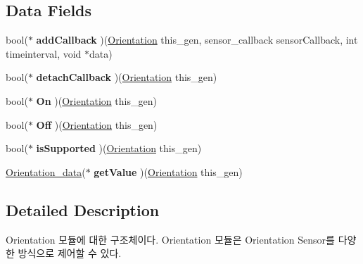 \subsection*{Data Fields}
\begin{DoxyCompactItemize}
\item 
\hypertarget{struct__Orientation_a62e2301d56463501b712969250de0b51}{bool($\ast$ {\bfseries add\-Callback} )(\hyperlink{struct__Orientation}{Orientation} this\-\_\-gen, sensor\-\_\-callback sensor\-Callback, int timeinterval, void $\ast$data)}\label{struct__Orientation_a62e2301d56463501b712969250de0b51}

\item 
\hypertarget{struct__Orientation_a5a0f426bae69f9f93d2455d65089084d}{bool($\ast$ {\bfseries detach\-Callback} )(\hyperlink{struct__Orientation}{Orientation} this\-\_\-gen)}\label{struct__Orientation_a5a0f426bae69f9f93d2455d65089084d}

\item 
\hypertarget{struct__Orientation_a1fdc91ded986983fc430dbb768964cf1}{bool($\ast$ {\bfseries On} )(\hyperlink{struct__Orientation}{Orientation} this\-\_\-gen)}\label{struct__Orientation_a1fdc91ded986983fc430dbb768964cf1}

\item 
\hypertarget{struct__Orientation_a5a8bf0f2c2a0508fb6ecf20731ae1965}{bool($\ast$ {\bfseries Off} )(\hyperlink{struct__Orientation}{Orientation} this\-\_\-gen)}\label{struct__Orientation_a5a8bf0f2c2a0508fb6ecf20731ae1965}

\item 
\hypertarget{struct__Orientation_af272be2847d4987b9107f4f016b573f1}{bool($\ast$ {\bfseries is\-Supported} )(\hyperlink{struct__Orientation}{Orientation} this\-\_\-gen)}\label{struct__Orientation_af272be2847d4987b9107f4f016b573f1}

\item 
\hypertarget{struct__Orientation_abb38457c67d18f412e911e5173d62419}{\hyperlink{Sensor_8h_df/d29/struct__3d__data}{Orientation\-\_\-data}($\ast$ {\bfseries get\-Value} )(\hyperlink{struct__Orientation}{Orientation} this\-\_\-gen)}\label{struct__Orientation_abb38457c67d18f412e911e5173d62419}

\end{DoxyCompactItemize}


\subsection{Detailed Description}
Orientation 모듈에 대한 구조체이다. Orientation 모듈은 Orientation Sensor를 다양한 방식으로 제어할 수 있다. 


